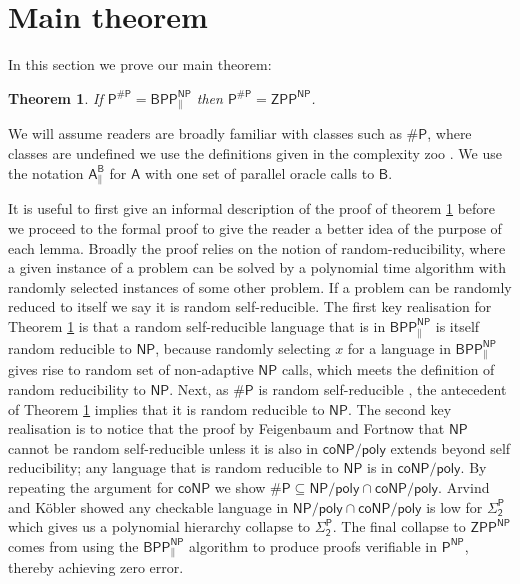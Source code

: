 \documentclass{article}
\newtheorem{theorem}{Theorem}
\begin{document}
\section{Main theorem}\label{sect:Approximate-exact counting theorem}
In this section we prove our main theorem:

\begin{theorem}\label{thm: main}
    If $\mathsf{P^{\# P}=BPP_{\parallel}^{NP}}$ then $\mathsf{P^{\# P}=ZPP^{NP}}$.
\end{theorem}


We will assume readers are broadly familiar with classes such as $\mathsf{\# P}$, where classes are undefined we use the definitions given in the complexity zoo \cite{zoo}. We use the notation $\mathsf{A_{\parallel}^{B}}$ for $\mathsf{A}$ with one set of parallel oracle calls to $\mathsf{B}$.

It is useful to first give an informal description of the proof of theorem \ref{thm: main} before we proceed to the formal proof to give the reader a better idea of the purpose of each lemma. Broadly the proof relies on the notion of random-reducibility, where a given instance of a problem can be solved by a polynomial time algorithm with randomly selected instances of some other problem. If a problem can be randomly reduced to itself we say it is random self-reducible. 
The first key realisation for Theorem \ref{thm: main} is that a random self-reducible language that is in $\mathsf{BPP^{NP}_{\parallel}}$ is itself random reducible to $\mathsf{NP}$, because randomly selecting $x$ for a language in $\mathsf{BPP^{NP}_{\parallel}}$ gives rise to random set of non-adaptive $\mathsf{NP}$ calls, which meets the definition of random reducibility to $\mathsf{NP}$.
Next, as $\mathsf{\#P}$ is random self-reducible \cite{feigenbaum1990random}, the antecedent of Theorem \ref{thm: main} implies that it is random reducible to $\mathsf{NP}$.
The second key realisation is to notice that the proof by Feigenbaum and Fortnow that $\mathsf{NP}$ cannot be random self-reducible unless it is also in $\mathsf{coNP/poly}$ extends beyond self reducibility; any language that is random reducible to $\mathsf{NP}$ is in $\mathsf{coNP/poly}$. 
By repeating the argument for $\mathsf{coNP}$ we show $\mathsf{\#P\subseteq NP/poly \cap coNP/poly}$. Arvind and Köbler \cite{ARVIND2002257} showed any checkable language in $\mathsf{NP/poly \cap coNP/poly}$  is low for $\mathsf{\Sigma^P_2}$ which gives us a polynomial hierarchy collapse to $\mathsf{\Sigma_2^P}$. The final collapse to $\mathsf{ZPP^{NP}}$ comes from using the $\mathsf{BPP^{NP}_{\parallel}}$ algorithm to produce proofs verifiable in $\mathsf{P^{NP}}$, thereby achieving zero error.
\end{document}
